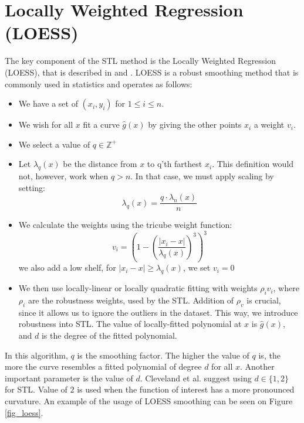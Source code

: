 \documentclass[main.tex]{subfiles}
\begin{document}
\section{Locally Weighted Regression (LOESS)}
\label{sec:locally_weighted_running_line_smoother}
The key component of the STL method is the Locally Weighted Regression (LOESS),
that is described in \cite{loess} and \cite{stl}. LOESS is a robust smoothing method that is
commonly used in statistics and operates as follows:
\begin{itemize}
\item We have a set of $(x_i, y_i)$ for $1 \leq i \leq n$.
\item We wish for all $x$ fit a curve $\hat{g}(x)$ by giving the other points $x_i$ a
  weight $v_i$.
\item We select a value of $q \in \mathbb{Z}^+$
\item Let $\lambda_q(x)$ be the distance from $x$ to q'th farthest $x_i$.
  This definition would not, however, work when $q > n$. In that case, we must
  apply scaling by setting:
  \[
  \lambda_q(x) = \frac{q \cdot \lambda_n(x)}{n}
  \]
\item We calculate the weights using the tricube weight function:
  \[
  v_i = \left( 1 - \left( \frac{| x_i - x |}{\lambda_q(x)}  \right)^3\right)^3
  \]
  we also add a low shelf, for $| x_i - x | \geq \lambda_q(x)$, we set $v_i = 0$
\item We then use locally-linear or locally quadratic fitting with weights
  $\rho_i v_i$, where $\rho_i$ are the robustness weights, used by the STL.
  Addition of $\rho_v$ is crucial, since it allows us to ignore the outliers
  in the dataset. This way, we introduce robustness into STL.
  The value of locally-fitted polynomial at $x$ is $\hat{g}(x)$, and $d$ is
  the degree of the fitted polynomial.
\end{itemize}
In this algorithm, $q$ is the smoothing factor. The higher the value of $q$ is, the more
the curve resembles a fitted polynomial of degree $d$ for all $x$. Another
important parameter is the value of $d$. Cleveland et al.
\cite{stl} suggest using $d \in \{1,2\}$ for STL. Value of $2$ is used when the
function of interest has a more pronounced curvature. An example of the usage of
LOESS smoothing can be seen on Figure \ref{fig_loess}.
\end{document}
